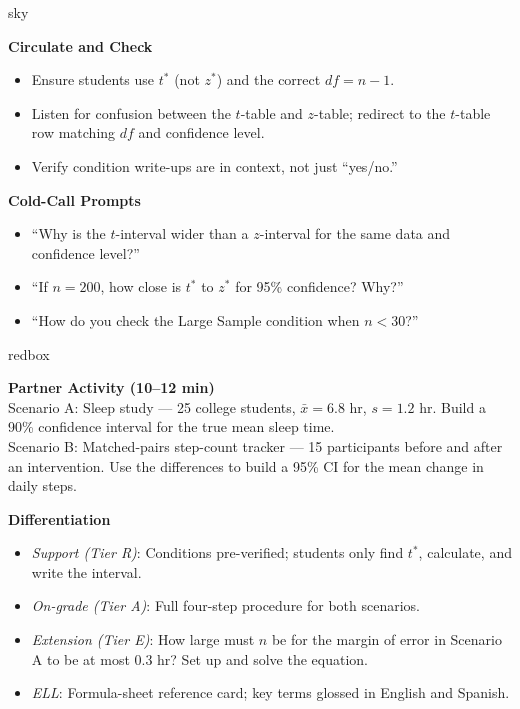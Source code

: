 \documentclass[10pt]{article}
\begin{document}
\begin{skillbox}{sky}
\begin{minipage}[t]{0.48\linewidth}
    \textbf{Circulate and Check}
    \begin{itemize}
        \item Ensure students use $t^*$ (not $z^*$) and the correct $df = n - 1$.
        \item Listen for confusion between the $t$-table and $z$-table; redirect to
              the $t$-table row matching $df$ and confidence level.
        \item Verify condition write-ups are in context, not just ``yes/no.''
    \end{itemize}
\end{minipage}
\hfill
\begin{minipage}[t]{0.48\linewidth}
    \textbf{Cold-Call Prompts}
    \begin{itemize}
        \item ``Why is the $t$-interval wider than a $z$-interval for the same
              data and confidence level?''
        \item ``If $n = 200$, how close is $t^*$ to $z^*$ for 95\% confidence?
              Why?''
        \item ``How do you check the Large Sample condition when $n < 30$?''
    \end{itemize}
\end{minipage}
\end{skillbox}

\begin{skillbox}{redbox}
\begin{minipage}[t]{0.48\linewidth}
    \textbf{Partner Activity (10--12 min)}\\
    Scenario A: Sleep study --- 25 college students, $\bar x = 6.8$ hr,
    $s = 1.2$ hr. Build a 90\% confidence interval for the true mean sleep time.\\[4pt]
    Scenario B: Matched-pairs step-count tracker --- 15 participants before and
    after an intervention. Use the differences to build a 95\% CI for the mean
    change in daily steps.
\end{minipage}
\hfill
\begin{minipage}[t]{0.48\linewidth}
    \textbf{Differentiation}
    \begin{itemize}
        \item \textit{Support (Tier R)}: Conditions pre-verified; students only
              find $t^*$, calculate, and write the interval.
        \item \textit{On-grade (Tier A)}: Full four-step procedure for both scenarios.
        \item \textit{Extension (Tier E)}: How large must $n$ be for the margin of
              error in Scenario A to be at most 0.3 hr? Set up and solve the equation.
        \item \textit{ELL}: Formula-sheet reference card; key terms glossed in
              English and Spanish.
    \end{itemize}
\end{minipage}
\end{skillbox}
\end{document}
